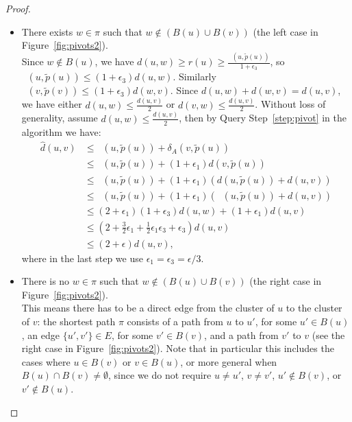 \documentclass[11pt]{article}
\theoremstyle{definition}
\theoremstyle{remark}
\DeclareMathOperator{\dLNbunch}{\delta_{\tilde{B}}}
\begin{document}
\begin{proof}
    \begin{itemize}
        \item[Case 1:] There exists $w\in \pi$ such that $w\notin (B(u)\cup B(v))$ (the left case in Figure~\ref{fig:pivots2}).\\
        Since $w\notin B(u)$, we have $d(u,w)\geq   r(u) \geq \tfrac{\dLNbunch(u,\tilde p(u))}{1+\epsilon_3}$, so $\dLNbunch(u,\tilde p(u))\leq (1+\epsilon_3)d(u,w)$. 
        Similarly $\dLNbunch(v,\tilde p(v)) \leq (1+\epsilon_3)d(w,v)$. Since $d(u,w)+d(w,v)=d(u,v)$, we have either
        $d(u,w)\leq \tfrac{d(u,v)}{2}$ or $d(v,w)\leq \tfrac{d(u,v)}{2}$. 
        Without loss of generality, assume $d(u,w) \leq \tfrac{d(u,v)}{2}$, then by Query Step~\ref{step:pivot} in the algorithm we have:
        \begin{align*} 
        \hat{d}(u,v) &\leq \dLNbunch(u,\tilde p(u))+\delta_A(v,\tilde p(u)) \\
        &\leq \dLNbunch(u,\tilde p(u)) +(1+\epsilon_1)d(v,\tilde p(u))\\
        &\leq \dLNbunch(u,\tilde p(u))+(1+\epsilon_1)(d(u,\tilde p(u))+d(u,v))\\
        &\leq \dLNbunch(u,\tilde p(u))+(1+\epsilon_1)(\dLNbunch(u,\tilde p(u))+d(u,v))\\
        &\leq  (2+\epsilon_1)(1+\epsilon_3)d(u,w)+(1+\epsilon_1)d(u,v)\\
        &\leq (2+\tfrac{3}{2}\epsilon_1+\tfrac{1}{2}\epsilon_1\epsilon_3+\epsilon_3)d(u,v)\\
        &\leq (2+\epsilon)d(u,v),
        \end{align*}
        where in the last step we use $\epsilon_1=\epsilon_3=\epsilon/3$.
        \item[Case 2:] 
        There is no $w\in \pi$ such that $w\notin (B(u)\cup B(v))$ (the right case in Figure~\ref{fig:pivots2}).
        \\ 
        This means there has to be a direct edge from the cluster of $u$ to the cluster of $v$: the shortest path $\pi$ consists of a path from $u$ to $u'$, for some $u'\in B(u)$, an edge $\{u',v'\}\in E$, for some $v'\in B(v)$, and a path from $v'$ to $v$ (see the right case in Figure~\ref{fig:pivots2}). Note that in particular this includes the cases where $u\in B(v)$ or $v\in B(u)$, or more general when $B(u)\cap B(v)\neq \emptyset$, since we do not require $u\neq u'$, $v\neq v'$, $u'\notin B(v)$, or $v'\notin B(u)$.\\

\end{itemize}
\end{proof}
\end{document}
